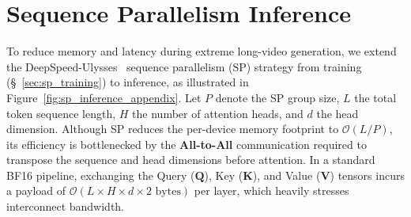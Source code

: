 \section{Sequence Parallelism Inference}\label{ap:sp_inference}

To reduce memory and latency during extreme long-video generation, we extend the DeepSpeed-Ulysses~\cite{jacobs2023deepspeed} sequence parallelism (SP) strategy from training (\S~\ref{sec:sp_training}) to inference, as illustrated in Figure~\ref{fig:sp_inference_appendix}. Let $P$ denote the SP group size, $L$ the total token sequence length, $H$ the number of attention heads, and $d$ the head dimension. Although SP reduces the per-device memory footprint to $\mathcal{O}(L/P)$, its efficiency is bottlenecked by the \textbf{All-to-All} communication required to transpose the sequence and head dimensions before attention. In a standard BF16 pipeline, exchanging the Query ($\mathbf{Q}$), Key ($\mathbf{K}$), and Value ($\mathbf{V}$) tensors incurs a payload of $\mathcal{O}(L \times H \times d \times 2 \text{ bytes})$ per layer, which heavily stresses interconnect bandwidth.



